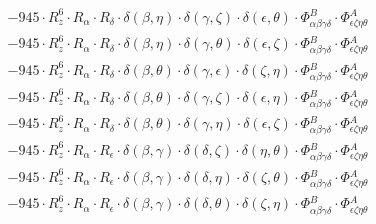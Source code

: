 \documentclass{article}
\begin{document}
\begin{equation}
\begin{array}{c}
 \\[0.2em] 		 - 945 \cdot R_{z}^{6} \cdot R_{\alpha{}} \cdot R_{\delta{}} \cdot \delta{}\left(\beta{}, \eta{}\right) \cdot \delta{}\left(\gamma{}, \zeta{}\right) \cdot \delta{}\left(\epsilon{}, \theta{}\right) \cdot \Phi{}^{B}_{\alpha{}\beta{}\gamma{}\delta{}} \cdot \Phi{}^{A}_{\epsilon{}\zeta{}\eta{}\theta{}} 
 \\[0.2em] 		 - 945 \cdot R_{z}^{6} \cdot R_{\alpha{}} \cdot R_{\delta{}} \cdot \delta{}\left(\beta{}, \eta{}\right) \cdot \delta{}\left(\gamma{}, \theta{}\right) \cdot \delta{}\left(\epsilon{}, \zeta{}\right) \cdot \Phi{}^{B}_{\alpha{}\beta{}\gamma{}\delta{}} \cdot \Phi{}^{A}_{\epsilon{}\zeta{}\eta{}\theta{}} 
 \\[0.2em] 		 - 945 \cdot R_{z}^{6} \cdot R_{\alpha{}} \cdot R_{\delta{}} \cdot \delta{}\left(\beta{}, \theta{}\right) \cdot \delta{}\left(\gamma{}, \epsilon{}\right) \cdot \delta{}\left(\zeta{}, \eta{}\right) \cdot \Phi{}^{B}_{\alpha{}\beta{}\gamma{}\delta{}} \cdot \Phi{}^{A}_{\epsilon{}\zeta{}\eta{}\theta{}} 
 \\[0.2em] 		 - 945 \cdot R_{z}^{6} \cdot R_{\alpha{}} \cdot R_{\delta{}} \cdot \delta{}\left(\beta{}, \theta{}\right) \cdot \delta{}\left(\gamma{}, \zeta{}\right) \cdot \delta{}\left(\epsilon{}, \eta{}\right) \cdot \Phi{}^{B}_{\alpha{}\beta{}\gamma{}\delta{}} \cdot \Phi{}^{A}_{\epsilon{}\zeta{}\eta{}\theta{}} 
 \\[0.2em] 		 - 945 \cdot R_{z}^{6} \cdot R_{\alpha{}} \cdot R_{\delta{}} \cdot \delta{}\left(\beta{}, \theta{}\right) \cdot \delta{}\left(\gamma{}, \eta{}\right) \cdot \delta{}\left(\epsilon{}, \zeta{}\right) \cdot \Phi{}^{B}_{\alpha{}\beta{}\gamma{}\delta{}} \cdot \Phi{}^{A}_{\epsilon{}\zeta{}\eta{}\theta{}} 
 \\[0.2em] 		 - 945 \cdot R_{z}^{6} \cdot R_{\alpha{}} \cdot R_{\epsilon{}} \cdot \delta{}\left(\beta{}, \gamma{}\right) \cdot \delta{}\left(\delta{}, \zeta{}\right) \cdot \delta{}\left(\eta{}, \theta{}\right) \cdot \Phi{}^{B}_{\alpha{}\beta{}\gamma{}\delta{}} \cdot \Phi{}^{A}_{\epsilon{}\zeta{}\eta{}\theta{}} 
 \\[0.2em] 		 - 945 \cdot R_{z}^{6} \cdot R_{\alpha{}} \cdot R_{\epsilon{}} \cdot \delta{}\left(\beta{}, \gamma{}\right) \cdot \delta{}\left(\delta{}, \eta{}\right) \cdot \delta{}\left(\zeta{}, \theta{}\right) \cdot \Phi{}^{B}_{\alpha{}\beta{}\gamma{}\delta{}} \cdot \Phi{}^{A}_{\epsilon{}\zeta{}\eta{}\theta{}} 
 \\[0.2em] 		 - 945 \cdot R_{z}^{6} \cdot R_{\alpha{}} \cdot R_{\epsilon{}} \cdot \delta{}\left(\beta{}, \gamma{}\right) \cdot \delta{}\left(\delta{}, \theta{}\right) \cdot \delta{}\left(\zeta{}, \eta{}\right) \cdot \Phi{}^{B}_{\alpha{}\beta{}\gamma{}\delta{}} \cdot \Phi{}^{A}_{\epsilon{}\zeta{}\eta{}\theta{}} 

\end{array}
\end{equation}
\end{document}
